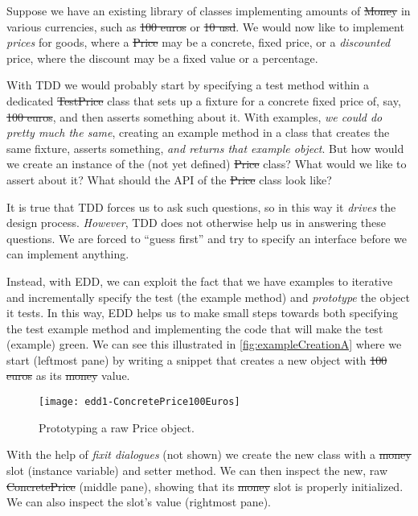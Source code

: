 \documentclass[acmsmall,screen,authorversion,nonacm]{acmart} %
\begin{document}

Suppose we have an existing library of classes implementing amounts of \st{Money} in various currencies, such as \st{100 euros} or \st{10 usd}.
We would now like to implement \emph{prices} for goods, where a \st{Price} may be a concrete, fixed price, or a \emph{discounted} price, where the discount may be a fixed value or a percentage.

With TDD we would probably start by specifying a test method within a dedicated \st{TestPrice} class that sets up a fixture for a concrete fixed price of, say, \st{100 euros}, and then asserts something about it.
With examples, \emph{we could do pretty much the same}, creating an example method in a  class that creates the same fixture, asserts something, \emph{and returns that example object}.
But how would we create an instance of the (not yet defined) \st{Price} class?
What would we like to assert about it?
What should the API of the \st{Price} class look like?

It is true that TDD forces us to ask such questions, so in this way it \emph{drives} the design process.
\emph{However}, TDD does not otherwise help us in answering these questions.
We are forced to ``guess first'' and try to specify an interface before we can implement anything.

Instead, with EDD, we can exploit the fact that we have examples to iterative and incrementally specify the test (\ie the example method) and \emph{prototype} the object it tests.
In this way, EDD helps us to make small steps towards both specifying the test example method and implementing the code that will make the test (example) green.
We can see this illustrated in \autoref{fig:exampleCreationA} where we start (leftmost pane) by writing a snippet that creates a new  object with \st{100 euros} as its \st{money} value.
\begin{figure}[h]
  \texttt{[image: edd1-ConcretePrice100Euros]}
	\caption{Prototyping a raw Price object.}
  \label{fig:exampleCreationA}
\end{figure}

With the help of \emph{fixit dialogues} (not shown) we create the new class with a \st{money} slot (instance variable) and setter method.
We can then inspect the new, raw \st{ConcretePrice} (middle pane), showing that its \st{money} slot is properly initialized.
We can also inspect the slot's value (rightmost pane).
\end{document}

